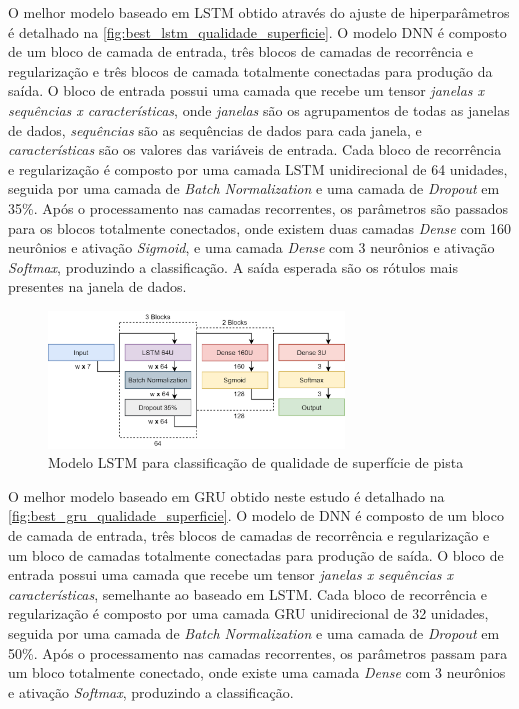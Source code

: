 O melhor modelo baseado em LSTM obtido através do ajuste de hiperparâmetros é detalhado na \autoref{fig:best_lstm_qualidade_superficie}. O modelo DNN é composto de um bloco de camada de entrada, três blocos de camadas de recorrência e regularização e três blocos de camada totalmente conectadas para produção da saída. O bloco de entrada possui uma camada que recebe um tensor \emph{janelas x sequências x características}, onde \emph{janelas} são os agrupamentos de todas as janelas de dados, \emph{sequências} são as sequências de dados para cada janela, e \emph{características} são os valores das variáveis de entrada. Cada bloco de recorrência e regularização é composto por uma camada LSTM unidirecional de 64 unidades, seguida por uma camada de \textit{Batch Normalization} e uma camada de \textit{Dropout} em 35\%. Após o processamento nas camadas recorrentes, os parâmetros são passados para os blocos totalmente conectados, onde existem duas camadas \textit{Dense} com 160 neurônios e ativação \textit{Sigmoid}, e uma camada \textit{Dense} com 3 neurônios e ativação \textit{Softmax}, produzindo a classificação. A saída esperada são os rótulos mais presentes na janela de dados.

\begin{figure}[h!]
  \centering
  \caption{Modelo LSTM para classificação de qualidade de superfície de pista}
  \label{fig:best_lstm_qualidade_superficie}
  \includegraphics[width=0.7\textwidth]{figuras/fig_46.png}
\end{figure}

O melhor modelo baseado em GRU obtido neste estudo é detalhado na \autoref{fig:best_gru_qualidade_superficie}. O modelo de DNN é composto de um bloco de camada de entrada, três blocos de camadas de recorrência e regularização e um bloco de camadas totalmente conectadas para produção de saída. O bloco de entrada possui uma camada que recebe um tensor \emph{janelas x sequências x características}, semelhante ao baseado em LSTM. Cada bloco de recorrência e regularização é composto por uma camada GRU unidirecional de 32 unidades, seguida por uma camada de \textit{Batch Normalization} e uma camada de \textit{Dropout} em 50\%. Após o processamento nas camadas recorrentes, os parâmetros passam para um bloco totalmente conectado, onde existe uma camada \textit{Dense} com 3 neurônios e ativação \textit{Softmax}, produzindo a classificação.

